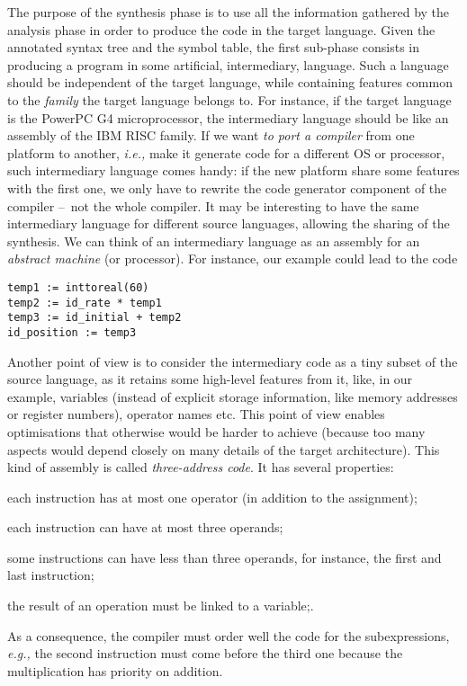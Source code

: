 The purpose of the synthesis phase is to use all the information
gathered by the analysis phase in order to produce the code in the
target language. Given the annotated syntax tree and the symbol table,
the first sub-phase consists in producing a program in some
artificial, intermediary, language. Such a language should be
independent of the target language, while containing features common
to the \emph{family} the target language belongs to. For instance, if
the target language is the PowerPC G4 microprocessor, the intermediary
language should be like an assembly of the IBM RISC family. If we want
\emph{to port a compiler} from one platform to another, \emph{i.e.,}
make it generate code for a different OS or processor, such
intermediary language comes handy: if the new platform share some
features with the first one, we only have to rewrite the code
generator component of the compiler --~not the whole compiler.  It may
be interesting to have the same intermediary language for different
source languages, allowing the sharing of the synthesis. We can think
of an intermediary language as an assembly for an \emph{abstract
  machine} (or processor). For instance, our example could lead to the
code
\begin{verbatim}
temp1 := inttoreal(60)
temp2 := id_rate * temp1
temp3 := id_initial + temp2
id_position := temp3
\end{verbatim}
Another point of view is to consider the intermediary code as a tiny
subset of the source language, as it retains some high-level features
from it, like, in our example, variables (instead of explicit storage
information, like memory addresses or register numbers), operator
names etc. This point of view enables optimisations that otherwise
would be harder to achieve (because too many aspects would depend
closely on many details of the target architecture). This kind of assembly is called \emph{three-address code}. It has
several properties:
\begin{itemize*}

  \item each instruction has at most one operator (in addition to the
  assignment);

  \item each instruction can have at most three operands;

  \item some instructions can have less than three operands, for
    instance, the first and last instruction;

  \item the result of an operation must be linked to a variable;.

\end{itemize*}
As a consequence, the compiler must order well the code for the
subexpressions, \emph{e.g.,} the second instruction must come before
the third one because the multiplication has priority on addition.

